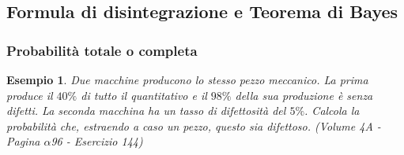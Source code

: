 \documentclass{article}     %
\newtheorem{ex}{Esempio}[section]
\begin{document}
            \subsection{Formula di disintegrazione e Teorema di Bayes}
                \subsubsection{Probabilità totale o completa}
                    \begin{ex}
                        Due macchine producono lo stesso pezzo meccanico. La prima produce il $40\%$ di tutto il quantitativo e il $98\%$ della sua produzione è senza difetti. La seconda macchina ha un tasso di difettosità del $5\%$. Calcola la probabilità che, estraendo a caso un pezzo, questo sia difettoso. (Volume 4A - Pagina $\alpha$96 - Esercizio 144)
                    \end{ex}
\end{document}
